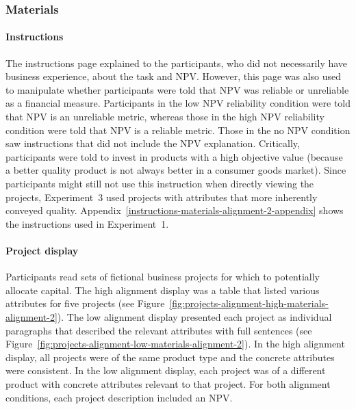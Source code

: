 \documentclass[a4paper, nobind, dvipsnames]{templates/ociamthesis}
\theoremstyle{definition}
\theoremstyle{definition}
\theoremstyle{definition}
\theoremstyle{definition}
\theoremstyle{remark}
\begin{document}
\hypertarget{materials-alignment-2}{%
\subsubsection{Materials}\label{materials-alignment-2}}

\hypertarget{instructions-materials-alignment-2}{%
\paragraph{Instructions}\label{instructions-materials-alignment-2}}

The instructions page explained to the participants, who did not necessarily
have business experience, about the task and NPV. However, this page was also
used to manipulate whether participants were told that NPV was reliable or
unreliable as a financial measure. Participants in the low NPV reliability
condition were told that NPV is an unreliable metric, whereas those in the high
NPV reliability condition were told that NPV is a reliable metric. Those in the
no NPV condition saw instructions that did not include the NPV explanation.
Critically, participants were told to invest in products with a high objective
value (because a better quality product is not always better in a consumer goods
market). Since participants might still not use this instruction when directly
viewing the projects, Experiment~3 used projects with attributes that more
inherently conveyed quality.
Appendix~\ref{instructions-materials-alignment-2-appendix} shows the
instructions used in Experiment~1.

\hypertarget{projects-materials-alignment-2}{%
\paragraph{Project display}\label{projects-materials-alignment-2}}

Participants read sets of fictional business projects for which to potentially
allocate capital. The high alignment display was a table that listed various
attributes for five projects (see
Figure~\ref{fig:projects-alignment-high-materials-alignment-2}). The low
alignment display presented each project as individual paragraphs that described
the relevant attributes with full sentences (see
Figure~\ref{fig:projects-alignment-low-materials-alignment-2}). In the high
alignment display, all projects were of the same product type and the concrete
attributes were consistent. In the low alignment display, each project was of a
different product with concrete attributes relevant to that project. For both
alignment conditions, each project description included an NPV.
\end{document}
